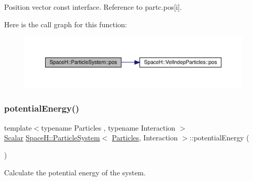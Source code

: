 Position vector const interface. Reference to partc.\+pos\mbox{[}i\mbox{]}. 

Here is the call graph for this function\+:
\nopagebreak
\begin{figure}[H]
\begin{center}
\leavevmode
\includegraphics[width=350pt]{class_space_h_1_1_particle_system_a779f51e7cf5ee524f02c09329496f6f0_cgraph}
\end{center}
\end{figure}
\mbox{\label{class_space_h_1_1_particle_system_a3b8fcc8922c6c32d888e0493d5058ae4}} 
\subsubsection{\texorpdfstring{potential\+Energy()}{potentialEnergy()}}
{\footnotesize\ttfamily template$<$typename Particles , typename Interaction $>$ \\
\mbox{\hyperlink{class_space_h_1_1_particle_system_a522770dcfaf8b29aed35ea9348185a34}{Scalar}} \mbox{\hyperlink{class_space_h_1_1_particle_system}{Space\+H\+::\+Particle\+System}}$<$ \mbox{\hyperlink{struct_space_h_1_1_particles}{Particles}}, Interaction $>$\+::potential\+Energy (\begin{DoxyParamCaption}{ }\end{DoxyParamCaption})\hspace{0.3cm}{\ttfamily [inline]}}



Calculate the potential energy of the system. 

